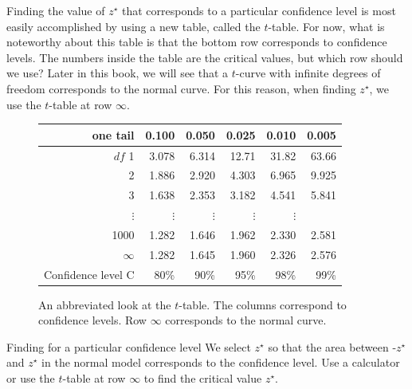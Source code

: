 Finding the value of $z^{\star}$ that corresponds to a particular confidence level is most easily accomplished by using a new table, called the $t$-table. For now, what is noteworthy about this table is that the bottom row corresponds to confidence levels. The numbers inside the table are the critical values, but which row should we use? Later in this book, we will see that a $t$-curve with infinite degrees of freedom corresponds to the normal curve. For this reason, when finding $z^{\star}$, we use the $t$-table at row $\infty$.

\D{\newpage}

\begin{figure}[hht]
\centering
\begin{tabular}{r | rrr rr}
one tail & \hspace{1.5mm}  0.100 & \hspace{1.5mm} 0.050 & \hspace{1.5mm} 0.025 & \hspace{1.5mm} 0.010 & \hspace{1.5mm} 0.005  \\
\hline
{$df$} \hfill 1  &  {\normalsize  3.078} & {\normalsize  6.314} & {\normalsize 12.71} & {\normalsize 31.82} & {\normalsize 63.66}  \\ 
2  &  {\normalsize  1.886} & {\normalsize  2.920} & {\normalsize  4.303} & {\normalsize  6.965} & {\normalsize  9.925}  \\ 
3  &  {\normalsize  1.638} & {\normalsize  2.353} & {\normalsize  3.182} & {\normalsize  4.541} & {\normalsize  5.841}  \\ 
$\vdots$ & $\vdots$ &$\vdots$ &$\vdots$ &$\vdots$ & \\
1000  &  {\normalsize  1.282} & {\normalsize  1.646} & {\normalsize  1.962} & {\normalsize  2.330} & {\normalsize  2.581}  \\ 
$\infty$   &  {\normalsize  1.282} & {\normalsize  1.645} & {\normalsize  1.960} & {\normalsize  2.326} & {\normalsize  2.576}   \\
\hline
Confidence level C  &  {\normalsize  80\%} & {\normalsize 90\%} & {\normalsize 95\%} & {\normalsize  98\%} & {\normalsize  99\%}  \\
\hline
\end{tabular}
\caption{An abbreviated look at the $t$-table. The columns correspond to confidence levels. Row $\infty$ corresponds to the normal curve.}
\label{tTableSample}
\end{figure}


\begin{onebox}{Finding for a particular confidence level}
We select $z^{\star}$ so that the area between -$z^{\star}$ and $z^{\star}$ in the normal model corresponds to the confidence level. Use a calculator or use the $t$-table at row $\infty$ to find the critical value $z^{\star}$.\end{onebox}

